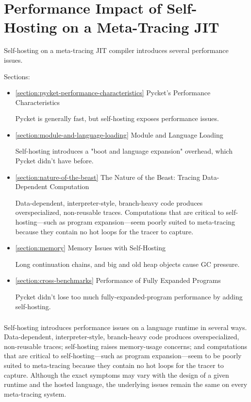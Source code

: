 \chapter{Performance Impact of Self-Hosting on a Meta-Tracing JIT}

	\label{chapter:problem}

	\begin{chaptersynopsis}
		\footnotesize
		Self-hosting on a meta-tracing JIT compiler introduces several performance issues.

		Sections:
		\begin{itemize}
			\item \ref{section:pycket-performance-characteristics} Pycket's Performance Characteristics

				Pycket is generally fast, but self-hosting exposes performance issues.
			\item \ref{section:module-and-language-loading} Module and Language Loading

				Self-hosting introduces a "boot and language expansion" overhead, which Pycket didn't have before.
			\item \ref{section:nature-of-the-beast} The Nature of the Beast: Tracing Data-Dependent Computation

				Data-dependent, interpreter-style, branch-heavy code produces overspecialized, non-reusable traces. Computations that are critical to self-hosting—such as program expansion—seem poorly suited to meta-tracing because they contain no hot loops for the tracer to capture.
			\item \ref{section:memory} Memory Issues with Self-Hosting

				Long continuation chains, and big and old heap objects cause GC pressure.
			\item \ref{section:cross-benchmarks} Performance of Fully Expanded Programs

				Pycket didn't lose too much fully-expanded-program performance by adding self-hosting.
		\end{itemize}
	\end{chaptersynopsis}

	\paragraph{}%
	 	Self-hosting introduces performance issues on a language runtime in several ways. Data-dependent, interpreter-style, branch-heavy code produces overspecialized, non-reusable traces; self-hosting raises memory-usage concerns; and computations that are critical to self-hosting—such as program expansion—seem to be poorly suited to meta-tracing because they contain no hot loops for the tracer to capture. Although the exact symptoms may vary with the design of a given runtime and the hosted language, the underlying issues remain the same on every meta-tracing system.

